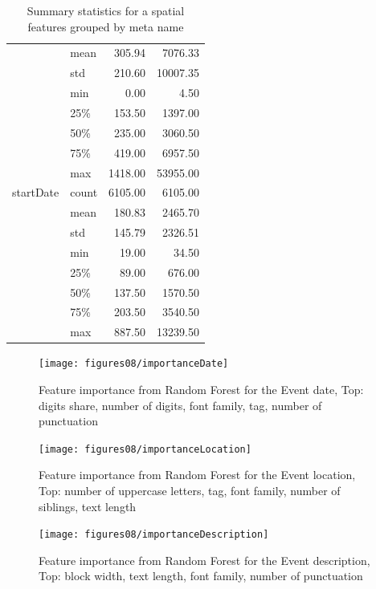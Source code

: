 \begin{table}
\begin{center}
\begin{tabular}{llrr}
            & mean &     305.94 &    7076.33 \\
            & std &     210.60 &   10007.35 \\
            & min &       0.00 &       4.50 \\
            & 25\% &     153.50 &    1397.00 \\
            & 50\% &     235.00 &    3060.50 \\
            & 75\% &     419.00 &    6957.50 \\
            & max &    1418.00 &   53955.00 \\
startDate & count &    6105.00 &    6105.00 \\
            & mean &     180.83 &    2465.70 \\
            & std &     145.79 &    2326.51 \\
            & min &      19.00 &      34.50 \\
            & 25\% &      89.00 &     676.00 \\
            & 50\% &     137.50 &    1570.50 \\
            & 75\% &     203.50 &    3540.50 \\
            & max &     887.50 &   13239.50 \\
\bottomrule
\end{tabular}

\caption{Summary statistics for a spatial features grouped by meta name}
\label{table:spatialDistr}
\end{center}
\end{table}  


\begin{figure}[h]
\begin{center}
\texttt{[image: figures08/importanceDate]}
\caption{Feature importance from Random Forest for the Event date, Top: digits share, number of digits, font family, tag, number of punctuation}
\label{fig:importanceDate}
\end{center}
\end{figure}

\begin{figure}[h]
\begin{center}
\texttt{[image: figures08/importanceLocation]}
\caption{Feature importance from Random Forest for the Event location, Top: number of uppercase letters, tag, font family, number of siblings, text length}
\label{fig:importanceLocation}
\end{center}
\end{figure}

\begin{figure}[h]
\begin{center}
\texttt{[image: figures08/importanceDescription]}
\caption{Feature importance from Random Forest for the Event description, Top: block width, text length, font family, number of punctuation}
\label{fig:importanceDescription}
\end{center}
\end{figure}


\label{append}